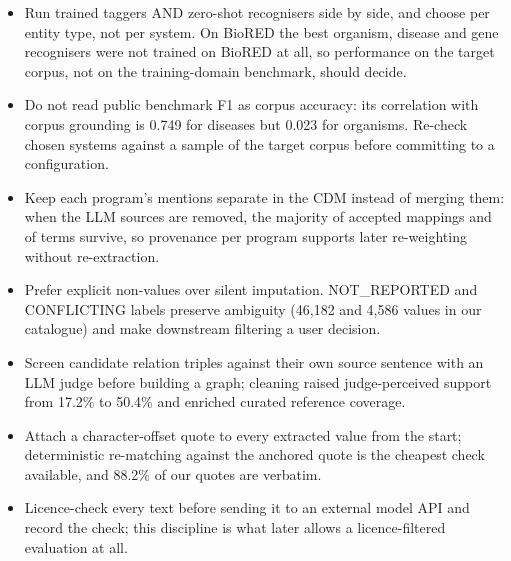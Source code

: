 \documentclass[referee,lineno,pdflatex,sn-vancouver-num]{sn-jnl}
\theoremstyle{thmstyleone}%
\theoremstyle{thmstyletwo}%
\theoremstyle{thmstylethree}%
\begin{document}
\begin{itemize}
\item Run trained taggers AND zero-shot recognisers side by side, and
choose per entity type, not per system. On BioRED the best organism,
disease and gene recognisers were not trained on BioRED at all, so
performance on the target corpus, not on the training-domain benchmark, should decide.
\item Do not read public benchmark F1 as corpus accuracy: its
correlation with corpus grounding is 0.749 for diseases but 0.023
for organisms. Re-check chosen systems against a sample of the
target corpus before committing to a configuration.
\item Keep each program's mentions separate in the CDM instead of
merging them: when the LLM sources are removed, the majority of
accepted mappings and of terms survive, so provenance per program
supports later re-weighting without re-extraction.
\item Prefer explicit non-values over silent imputation. NOT\_REPORTED
and CONFLICTING labels preserve ambiguity (46{,}182 and 4{,}586 values
in our catalogue) and make downstream filtering a user decision.
\item Screen candidate relation triples against their own source
sentence with an LLM judge before building a graph; cleaning raised
judge-perceived support from 17.2\% to 50.4\% and enriched curated
reference coverage.
\item Attach a character-offset quote to every extracted value from
the start; deterministic re-matching against the anchored quote is
the cheapest check available, and 88.2\% of our quotes are verbatim.
\item Licence-check every text before sending it to an external
model API and record the check; this discipline is what later allows
a licence-filtered evaluation at all.
\end{itemize}
\end{document}
